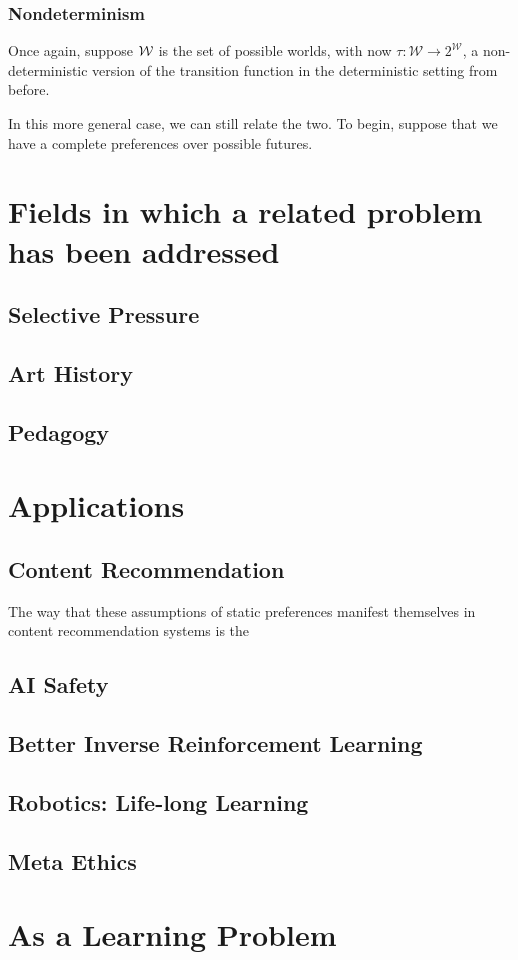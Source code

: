 \documentclass{book}
\begin{document}
	
	\subsubsection{Nondeterminism}
	Once again, suppose $\cal W$ is the set of possible worlds, with now $\tau: \mathcal W \to 2^{\mathcal W}$, a non-deterministic version of the transition function in the deterministic setting from before.
	
	In this more general case, we can still relate the two. To begin, suppose that we have a complete preferences over possible futures. 
	
	
	\section{Fields in which a related problem has been addressed}
	
	\subsection{Selective Pressure}
	\subsection{Art History} %
	\subsection{Pedagogy} %
	\subsection{}
	
	
	\section{Applications}
	
	\subsection{Content Recommendation}
	The way that these assumptions of static preferences manifest themselves in content recommendation systems is the
	
	\subsection{AI Safety}
	\subsection{Better Inverse Reinforcement Learning}
	\subsection{Robotics: Life-long Learning}
	\subsection{Meta Ethics}
	
	\section{As a Learning Problem}
	
	
\end{document}
